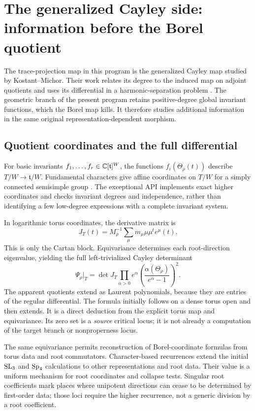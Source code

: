 \section{The generalized Cayley side: information before the Borel quotient}
The trace-projection map in this program is the generalized Cayley map studied by Kostant--Michor. Their work relates its degree to the induced map on adjoint quotients and uses its differential in a harmonic-separation problem \cite{KM}. The geometric branch of the present program retains positive-degree global invariant functions, which the Borel map kills. It therefore studies additional information in the same original representation-dependent morphism.

\subsection{Quotient coordinates and the full differential}
For basic invariants $f_1,\ldots,f_r\in\mathbb C[\mathfrak t]^W$, the functions $f_i(\Theta_\rho(t))$ describe $T/W\to\mathfrak t/W$. Fundamental characters give affine coordinates on $T/W$ for a simply connected semisimple group \cite{Steinberg}. The exceptional API implements exact higher coordinates and checks invariant degrees and independence, rather than identifying a few low-degree expressions with a complete invariant system.

In logarithmic torus coordinates, the derivative matrix is
\[
 J_T(t)=M_\rho^{-1}\sum_\mu m_\mu\mu\mu^t e^\mu(t).
\]
This is only the Cartan block. Equivariance determines each root-direction eigenvalue, yielding the full left-trivialized Cayley determinant
\[
 \Psi_\rho|_T=\det J_T\prod_{\alpha>0}
 e^\alpha\left(\frac{\alpha(\Theta_\rho)}{e^\alpha-1}\right)^2.
\]
The apparent quotients extend as Laurent polynomials, because they are entries of the regular differential. The formula initially follows on a dense torus open and then extends. It is a direct deduction from the explicit torus map and equivariance. Its zero set is a \emph{source} critical locus; it is not already a computation of the target branch or nonproperness locus.

The same equivariance permits reconstruction of Borel-coordinate formulas from torus data and root commutators. Character-based recurrences extend the initial $\operatorname{SL}_3$ and $\operatorname{Sp}_4$ calculations to other representations and root data. Their value is a uniform mechanism for root coordinates and collapse tests. Singular root coefficients mark places where unipotent directions can cease to be determined by first-order data; those loci require the higher recurrence, not a generic division by a root coefficient.

